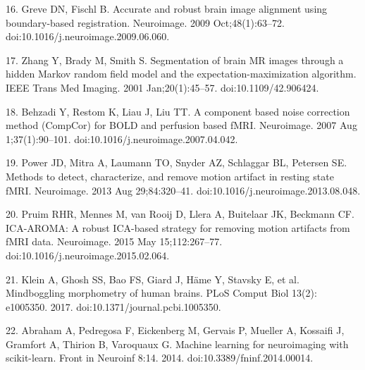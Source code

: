 16. Greve DN, Fischl B. Accurate and robust brain image alignment using boundary-based registration. Neuroimage. 2009 Oct;48(1):63–72. doi:10.1016/j.neuroimage.2009.06.060.

17. Zhang Y, Brady M, Smith S. Segmentation of brain MR images through a hidden Markov random field model and the expectation-maximization algorithm. IEEE Trans Med Imaging. 2001 Jan;20(1):45–57. doi:10.1109/42.906424.

18. Behzadi Y, Restom K, Liau J, Liu TT. A component based noise correction method (CompCor) for BOLD and perfusion based fMRI. Neuroimage. 2007 Aug 1;37(1):90–101. doi:10.1016/j.neuroimage.2007.04.042.

19. Power JD, Mitra A, Laumann TO, Snyder AZ, Schlaggar BL, Petersen SE. Methods to detect, characterize, and remove motion artifact in resting state fMRI. Neuroimage. 2013 Aug 29;84:320–41. doi:10.1016/j.neuroimage.2013.08.048.

20. Pruim RHR, Mennes M, van Rooij D, Llera A, Buitelaar JK, Beckmann CF. ICA-AROMA: A robust ICA-based strategy for removing motion artifacts from fMRI data. Neuroimage. 2015 May 15;112:267–77. doi:10.1016/j.neuroimage.2015.02.064.

21. Klein A, Ghosh SS, Bao FS, Giard J, Häme Y, Stavsky E, et al. Mindboggling morphometry of human brains. PLoS Comput Biol 13(2): e1005350. 2017. doi:10.1371/journal.pcbi.1005350.

22. Abraham A, Pedregosa F, Eickenberg M, Gervais P, Mueller A, Kossaifi J, Gramfort A, Thirion B, Varoquaux G. Machine learning for neuroimaging with scikit-learn. Front in Neuroinf 8:14. 2014. doi:10.3389/fninf.2014.00014.
